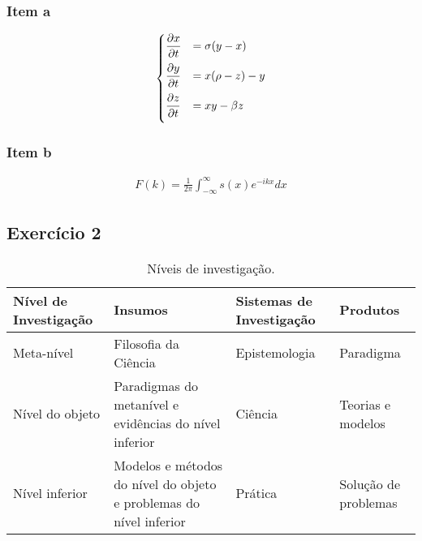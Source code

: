 \documentclass[11pt]{article}
\begin{document}
\subsubsection{Item a}
\label{sec:org65d61d0}
\begin{equation}
\begin{aligned}
\begin{cases}
\vspace{2mm}
\dfrac{\partial{}x}{\partial{}t} &= \sigma{}(y-x) \\

\vspace{2mm}
\dfrac{\partial{y}}{\partial{t}} &= x(\rho{} - z) -y\\

\vspace{2mm}

\dfrac{\partial{z}}{\partial{t}} &= xy-\beta{}z
\end{cases}
\end{aligned}
\end{equation}
\subsubsection{Item b}
\label{sec:orgb900c0a}

\begin{equation}
\begin{aligned}
F(k) = \frac{1}{2\pi}\int_{-\infty}^{\infty}{s(x)e^{-ikx}dx}
\end{aligned}
\end{equation}

\subsection{Exercício 2}
\label{sec:org59e4059}

\begin{table}[htb]
\ABNTEXfontereduzida
\caption[Níveis de investigação]{Níveis de investigação.}
\label{tab-nivinv}
\begin{tabular}{p{2.6cm}|p{6.0cm}|p{2.25cm}|p{3.40cm}}
   \textbf{Nível de Investigação} & \textbf{Insumos}  & \textbf{Sistemas de Investigação}  & \textbf{Produtos}  \\
    \hline
    Meta-nível & Filosofia\index{filosofia} da Ciência  & Epistemologia &
    Paradigma  \\
    \hline
    Nível do objeto & Paradigmas do metanível e evidências do nível inferior &
    Ciência  & Teorias e modelos \\
    \hline
    Nível inferior & Modelos e métodos do nível do objeto e problemas do nível inferior & Prática & Solução de problemas  \\
\end{tabular}
\end{table}
\end{document}
